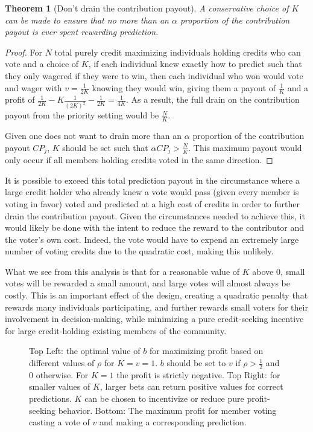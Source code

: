 \documentclass{article}
\newtheorem{theorem}{Theorem}[section]
\begin{document}
\begin{theorem}[Don't drain the contribution payout]
A conservative choice of $K$ can be made to ensure that no more than an $\alpha$ proportion of the contribution payout is ever spent rewarding prediction.
\end{theorem}

\begin{proof}
For $N$ total purely credit maximizing individuals holding credits who can vote and a choice of $K$, if each individual knew exactly how to predict such that they only wagered if they were to win, then each individual who won would vote and wager with $v = \frac{1}{2 K}$ knowing they would win, giving them a payout of $\frac{1}{K}$ and a profit of $\frac{1}{2 K} - K \frac{1}{(2 K)^2} - \frac{1}{2 K} = \frac{1}{4 K}$. As a result, the full drain on the contribution payout from the priority setting would be $\frac{N}{K}$.

Given one does not want to drain more than an $\alpha$ proportion of the contribution payout $CP_j$, $K$ should be set such that $\alpha CP_j > \frac{N}{K}$. This maximum payout would only occur if all members holding credits voted in the same direction.
\end{proof}

It is possible to exceed this total prediction payout in the circumstance where a large credit holder who already knew a vote would pass (given every member is voting in favor) voted and predicted at a high cost of credits in order to further drain the contribution payout. Given the circumstances needed to achieve this, it would likely be done with the intent to reduce the reward to the contributor and the voter's own cost. Indeed, the vote would have to expend an extremely large number of voting credits due to the quadratic cost, making this unlikely.

What we see from this analysis is that for a reasonable value of $K$ above 0, small votes will be rewarded a small amount, and large votes will almost always be costly. This is an important effect of the design, creating a quadratic penalty that rewards many individuals participating, and further rewards small voters for their involvement in decision-making, while minimizing a pure credit-seeking incentive for large credit-holding existing members of the community.

\begin{figure}[h]
    \centering
    \caption{Top Left: the optimal value of $b$ for maximizing profit based on different values of $\rho$ for $K=v=1$. $b$ should be set to $v$ if $\rho > \frac{1}{2}$ and 0 otherwise. For $K=1$ the profit is strictly negative. Top Right: for smaller values of $K$, larger bets can return positive values for correct predictions. $K$ can be chosen to incentivize or reduce pure profit-seeking behavior. Bottom: The maximum profit for member voting casting a vote of $v$ and making a corresponding prediction.}
\end{figure}
\end{document}
